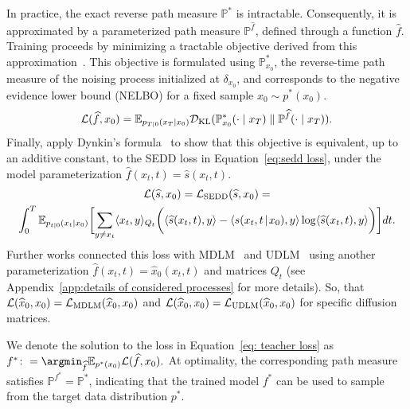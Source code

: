         In practice, the exact reverse path measure $\mathbb{P}^*$ is intractable. Consequently, it is approximated by a parameterized path measure $\mathbb{P}^{\widehat{f}}$, defined through a function $\widehat{f}$. Training proceeds by minimizing a tractable objective derived from this approximation~\citep{campbell2022continuous, song2021maximum, lou2024discrete}. This objective is formulated using $\mathbb{P}^*_{x_0}$, the reverse-time path measure of the noising process initialized at $\delta_{x_0}$, and corresponds to the negative evidence lower bound (NELBO) for a fixed sample $x_0 \sim p^*(x_0)$.
        \begin{equation}
        \label{eq: teacher loss}
            \mathcal{L}(\widehat{f}, x_0) = \mathbb{E}_{p_{T\mid 0}(x_T \mid x_0)} \mathcal{D}_{\text{KL}}(\mathbb{P}^*_{x_0} (\cdot \mid x_T) \parallel \mathbb{P}^{\widehat{f}}(\cdot \mid x_T)).
        \end{equation}
        Finally, \citet{lou2024discrete} apply Dynkin’s formula~\citep{hanson2007applied, campbell2022continuous} to show that this objective is equivalent, up to an additive constant, to the SEDD loss in Equation~\eqref{eq:sedd loss}, under the model parameterization $\widehat{f}(x_t, t) = \widehat{s}(x_t, t)$.
        \begin{gather}
            \mathcal{L}(\widehat{s}, x_0)=\mathcal{L}_{\text{SEDD}}(\widehat{s}, x_0) = \nonumber \\ \int_0^T \mathbb{E}_{p_{t|0}(x_t|x_0)} \biggl[\sum_{y \neq x_t} \langle x_t, y\rangle_{Q_t} \biggl(\langle \widehat{s}(x_t,t), y\rangle -  \langle s(x_t,t \! \mid \! x_0), y\rangle \log  \langle \widehat{s}(x_t, t), y\rangle \biggr)\biggr]dt. 
        \end{gather}
        Further works connected this loss with MDLM~\citep{sahoo2024simple} and UDLM~\citep{schiff2024discreteguidance} using another parameterization $\widehat{f}(x_t, t) = \widehat{x}_0(x_t, t)$ and matrices $Q_t$ (see Appendix~\ref{app:details of considered processes} for more details). So, that $\mathcal{L}(\widehat{x}_0, x_0) = \mathcal{L}_{\text{MDLM}}(\widehat{x}_0, x_0)$ and $\mathcal{L}(\widehat{x}_0, x_0)=\mathcal{L}_{\text{UDLM}}(\widehat{x}_0, x_0)$ for specific diffusion matrices.

        We denote the solution to the loss in Equation~\eqref{eq: teacher loss} as $f^* \colon= \argmin_{\widehat{f}} \mathbb{E}_{p^*(x_0)} \LC(\widehat{f}, x_0).$ At optimality, the corresponding path measure satisfies $\mathbb{P}^{f^*} = \mathbb{P}^*$, indicating that the trained model $f^*$ can be used to sample from the target data distribution $p^*$.
        
